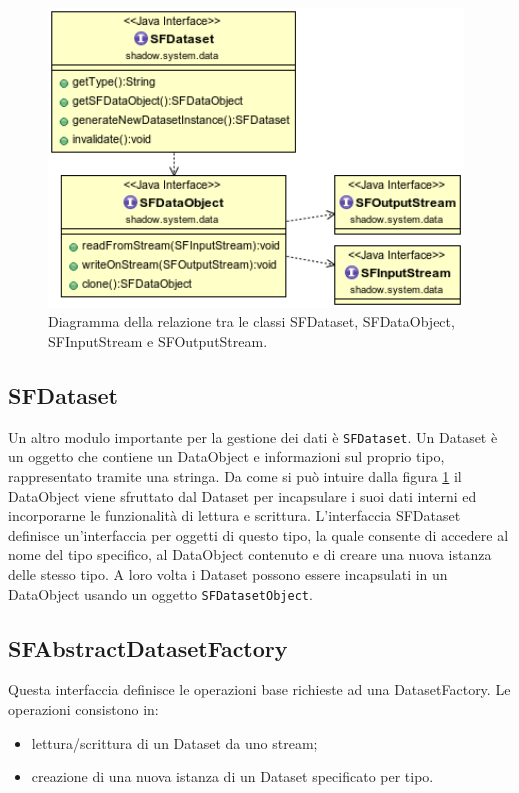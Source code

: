\begin{figure}
\begin{center}
\includegraphics[width=11cm]{Immagini/relazione-dataset-dataobject-stream}
\caption[Relazioni tra le classi di gestione dati.]{Diagramma della relazione tra le classi SFDataset, SFDataObject, SFInputStream e SFOutputStream.\label{f:dataset-dataobj-stream}} 
\end{center} 
\end{figure}

\subsection{SFDataset}
\label{sub:sfdataset}
Un altro modulo importante per la gestione dei dati \`e \texttt{SFDataset}. Un Dataset \`e un oggetto che contiene un DataObject e informazioni sul proprio tipo, rappresentato tramite una stringa.
Da come si pu\`o intuire dalla figura \ref{f:dataset-dataobj-stream} il DataObject viene sfruttato dal Dataset per incapsulare i suoi dati interni ed incorporarne le funzionalit\`a di lettura e scrittura.
L'interfaccia SFDataset definisce un'interfaccia per oggetti di questo tipo, la quale consente di accedere al nome del tipo specifico, al DataObject contenuto e di creare una nuova istanza delle stesso tipo.
A loro volta i Dataset possono essere incapsulati in un DataObject usando un oggetto \texttt{SFDatasetObject}.

\subsection{SFAbstractDatasetFactory}
\label{sub:sfabstractdatasetfactory}
Questa interfaccia definisce le operazioni base richieste ad una DatasetFactory. Le operazioni consistono in:
\begin{itemize}
	\item lettura/scrittura di un Dataset da uno stream;
	\item creazione di una nuova istanza di un Dataset specificato per tipo.
\end{itemize}

